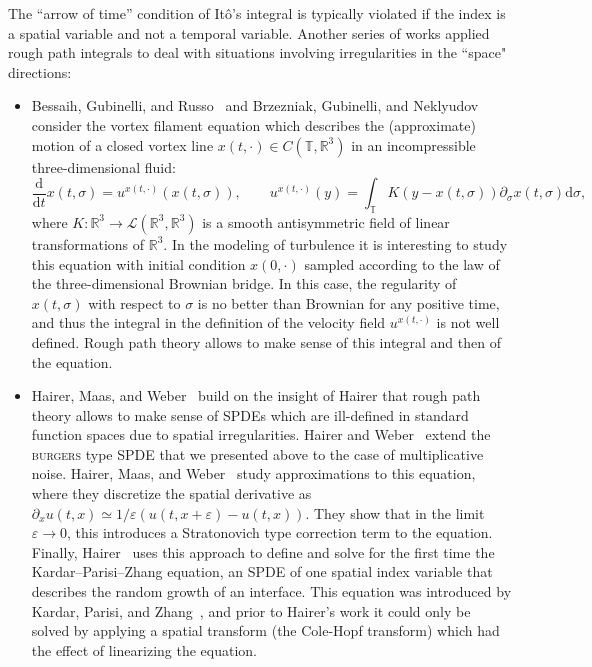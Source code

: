 \documentclass[11pt,a4paper]{article}
\newcommand{\mathd}{\mathrm{d}}
\theoremstyle{remark}
\begin{document}
The ``arrow of time'' condition of It\^o's integral is typically violated if the index is a spatial variable and not a temporal variable. Another series of works applied rough path integrals to deal with situations involving irregularities in the ``space" directions:

\begin{itemize}
\item[--]
Bessaih, Gubinelli, and Russo~\cite{Bessaih2005} and Brzezniak, Gubinelli, and Neklyudov~\cite{Brzezniak2010} consider the vortex filament equation which describes the (approximate) motion of a closed vortex line $x(t,\cdot)\in C(\mathbb{T},\mathbb{R}^3)$ in an incompressible three-dimensional fluid:
$$
\frac{\mathd}{\mathd t} x(t,\sigma) = u^{x(t,\cdot)}(x(t,\sigma)),\qquad u^{x(t,\cdot)}(y) = \int_{\mathbb{T}} K(y-x(t,\sigma)) \partial_\sigma x(t,\sigma) \mathd \sigma,
$$
where $K:\mathbb{R}^3 \to \mathcal{L}(\mathbb{R}^3,\mathbb{R}^3)$ is a smooth antisymmetric field of linear transformations of $\mathbb{R}^3$. In the modeling of turbulence it is interesting to study this equation with initial condition $x(0,\cdot)$ sampled according to the law of the three-dimensional Brownian bridge. In this case, the regularity of $x(t,\sigma)$ with respect to $\sigma$ is no better than Brownian for any positive time, and thus the integral in the definition of the velocity field $u^{x(t,\cdot)}$ is not well defined. Rough path theory allows to make sense of this integral and then of the equation.%

\item[--]
Hairer, Maas, and Weber~\cite{Hairer2011, Hairer2013, Hairer2013b, Hairer2012} build on the insight of Hairer that rough path theory allows to make sense of SPDEs which are ill-defined in standard function spaces due to spatial irregularities. Hairer and Weber~\cite{Hairer2013} extend the \textsc{burgers} type SPDE that we presented above to the case of multiplicative noise. Hairer, Maas, and Weber~\cite{Hairer2012} study approximations to this equation, where they discretize the spatial derivative as $\partial_x u(t,x) \simeq 1/\varepsilon (u(t,x+\varepsilon) - u(t,x))$. They show that in the limit $\varepsilon \rightarrow 0$, this introduces a Stratonovich type correction term to the equation. Finally, Hairer~\cite{Hairer2013b} uses this approach to  define and solve for the first time the Kardar--Parisi--Zhang equation, an SPDE of one spatial index variable that describes the random growth of an interface. This equation was introduced by Kardar, Parisi, and Zhang~\cite{Kardar1986}, and prior to Hairer's work it could only be solved by applying a spatial transform (the Cole-Hopf transform) which had the effect of linearizing the equation.
\end{itemize}
\end{document}
